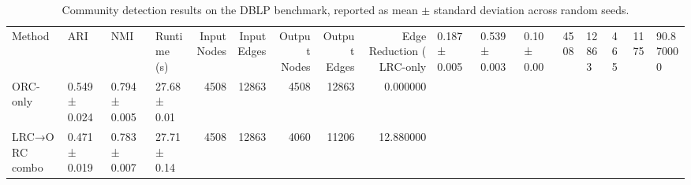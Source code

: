 \begin{table}
\caption{Community detection results on the DBLP benchmark, reported as mean $\pm$ standard deviation across random seeds.}
\label{tab:dblp_results}
\begin{tabular}{llllrrrrr}
\toprule
Method & ARI & NMI & Runtime (s) & Input Nodes & Input Edges & Output Nodes & Output Edges & Edge Reduction (%
\midrule
LRC-only & 0.187 ± 0.005 & 0.539 ± 0.003 & 0.10 ± 0.00 & 4508 & 12863 & 465 & 1175 & 90.870000 \\
ORC-only & 0.549 ± 0.024 & 0.794 ± 0.005 & 27.68 ± 0.01 & 4508 & 12863 & 4508 & 12863 & 0.000000 \\
LRC→ORC combo & 0.471 ± 0.019 & 0.783 ± 0.007 & 27.71 ± 0.14 & 4508 & 12863 & 4060 & 11206 & 12.880000 \\
\bottomrule
\end{tabular}
\end{table}
